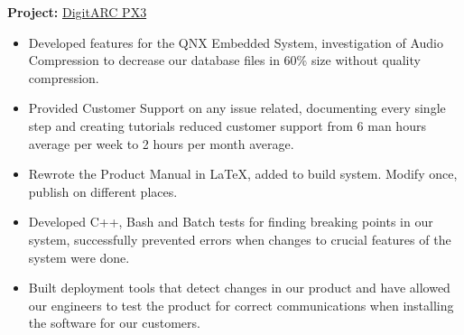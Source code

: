 \documentclass{scrartcl}
\begin{document}
\begin{minipage}[t]{0.69\textwidth}
	\textbf{Project:} \href{http://amige.com/meltshops_technological_controls_digitarc_px3.html}{DigitARC PX3}
	\begin{itemize}[noitemsep]
		\item Developed features for the QNX Embedded System, investigation of Audio Compression to decrease our database files in 60\% size without quality compression.
		\item Provided Customer Support on any issue related, documenting every single step and creating tutorials reduced customer support from 6 man hours average per week to 2 hours per month average.
	\item Rewrote the Product Manual in \LaTeX, added to build system. Modify once, publish on different places.
	\item Developed C++, Bash and Batch tests for finding breaking points in our system, successfully prevented errors when changes to crucial features of the system were done.
	\item Built deployment tools that detect changes in our product and have allowed our engineers to test the product for correct communications when installing the software for our customers.
	\end{itemize}
\end{minipage}
\hfill
\end{document}

